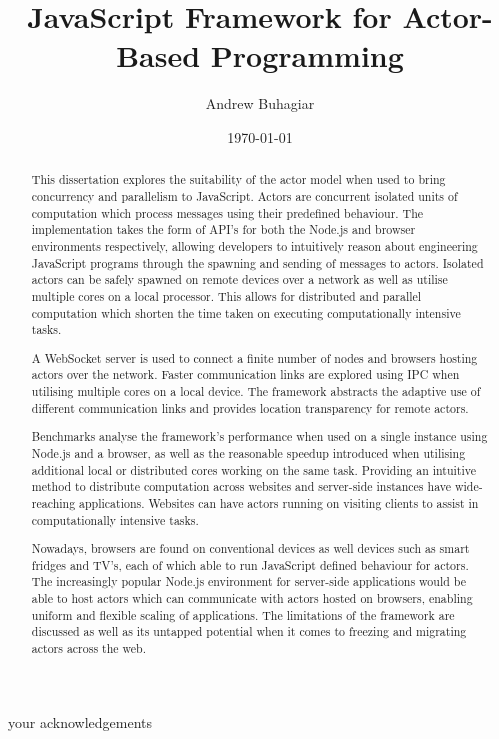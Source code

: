 \documentclass[12pt, a4paper]{report}
\theoremstyle{definition}
\theoremstyle{definition}%
\theoremstyle{definition}%
\theoremstyle{definition}%
\theoremstyle{definition}%
\theoremstyle{definition}%
\begin{document}
\title{JavaScript Framework for Actor-Based Programming}
\author{Andrew Buhagiar}
\date{\today}

\frontmatter


\begin{acknowledgements}
your acknowledgements
\end{acknowledgements}
       
\begin{abstract}
This dissertation explores the suitability of the actor model when used to bring concurrency and parallelism to JavaScript. Actors are concurrent isolated units of computation which process messages using their predefined behaviour. The implementation takes the form of API’s for both the Node.js and browser environments respectively, allowing developers to intuitively reason about engineering JavaScript programs through the spawning and sending of messages to actors. Isolated actors can be safely spawned on remote devices over a network as well as utilise multiple cores on a local processor.  This allows for distributed and parallel computation which shorten the time taken on executing computationally intensive tasks. 

A WebSocket server is used to connect a finite number of nodes and browsers hosting actors over the network. Faster communication links are explored using IPC when utilising multiple cores on a local device. The framework abstracts the adaptive use of different communication links and provides location transparency for remote actors. 

Benchmarks analyse the framework’s performance when used on a single instance using Node.js and a browser, as well as the reasonable speedup introduced when utilising additional local or distributed cores working on the same task. Providing an intuitive method to distribute computation across websites and server-side instances have wide-reaching applications. Websites can have actors running on visiting clients to assist in computationally intensive tasks. 

Nowadays, browsers are found on conventional devices as well devices such as smart fridges and TV’s, each of which able to run JavaScript defined behaviour for actors. The increasingly popular Node.js environment for server-side applications would be able to host actors which can communicate with actors hosted on browsers, enabling uniform and flexible scaling of applications. The limitations of the framework are discussed as well as its untapped potential when it comes to freezing and migrating actors across the web.
\end{abstract}
\end{document}
